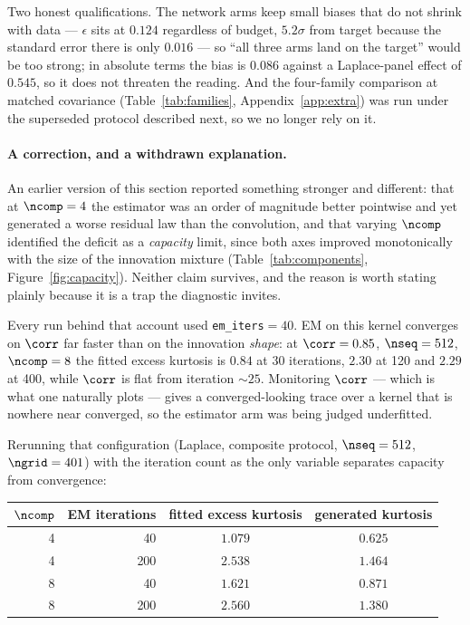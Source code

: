 \documentclass{article}
\begin{document}
Two honest qualifications. The network arms keep small biases that do not shrink with data ---
$\epsilon$ sits at $0.124$ regardless of budget, $5.2\sigma$ from target because the standard
error there is only $0.016$ --- so ``all three arms land on the target'' would be too strong; in
absolute terms the bias is $0.086$ against a Laplace-panel effect of $0.545$, so it does not
threaten the reading. And the four-family comparison at matched covariance
(Table~\ref{tab:families}, Appendix~\ref{app:extra}) was run under the superseded protocol
described next, so we no longer rely on it.

\paragraph{A correction, and a withdrawn explanation.} An earlier version of this section
reported something stronger and different: that at $\ncomp=4$ the estimator was an order of
magnitude better pointwise and yet generated a worse residual law than the convolution, and that
varying $\ncomp$ identified the deficit as a \emph{capacity} limit, since both axes improved
monotonically with the size of the innovation mixture (Table~\ref{tab:components},
Figure~\ref{fig:capacity}). Neither claim survives, and the reason is worth stating plainly
because it is a trap the diagnostic invites.

Every run behind that account used \texttt{em\_iters}${}=40$. EM on this kernel converges on
$\corr$ far faster than on the innovation \emph{shape}: at $\corr=0.85$, $\nseq=512$, $\ncomp=8$
the fitted excess kurtosis is $0.84$ at 30 iterations, $2.30$ at 120 and $2.29$ at 400, while
$\corr$ is flat from iteration ${\sim}25$. Monitoring $\corr$ --- which is what one naturally
plots --- gives a converged-looking trace over a kernel that is nowhere near converged, so the
estimator arm was being judged underfitted.

Rerunning that configuration (Laplace, composite protocol, $\nseq=512$, $\ngrid=401$) with the
iteration count as the only variable separates capacity from convergence:

\begin{center}\small
\begin{tabular}{@{}rrcc@{}}
\toprule
$\ncomp$ & EM iterations & fitted excess kurtosis & generated kurtosis \\
\midrule
4  & 40  & $1.079$ & $0.625$ \\
4  & 200 & $2.538$ & $1.464$ \\
8  & 40  & $1.621$ & $0.871$ \\
8  & 200 & $2.560$ & $1.380$ \\
\bottomrule
\end{tabular}
\end{center}
\end{document}
